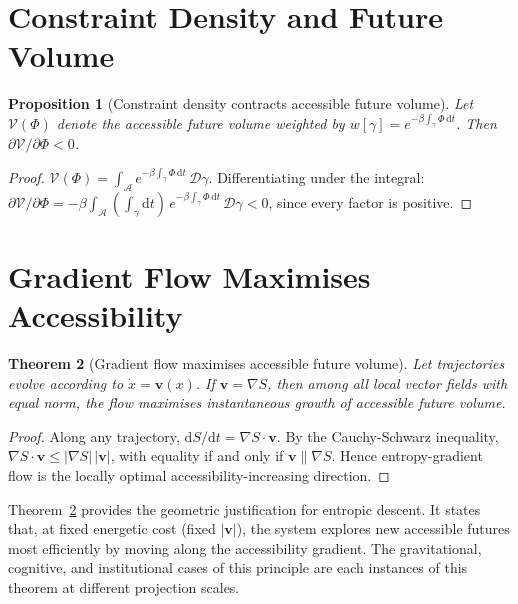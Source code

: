 \documentclass[12pt, oneside]{book}
\theoremstyle{plain}
\newtheorem{theorem}{Theorem}[chapter]
\newtheorem{proposition}[theorem]{Proposition}
\theoremstyle{definition}
\newcommand{\vfield}{\mathbf{v}}
\newcommand{\dd}{\mathrm{d}}
\newcommand{\nab}{\nabla}
\newcommand{\Vac}{\mathcal{V}}
\newcommand{\Adm}{\mathcal{A}}
\begin{document}
\section{Constraint Density and Future Volume}
\label{sec:constraint}

\begin{proposition}[Constraint density contracts accessible future volume]
\label{prop:contraction}
Let $\Vac(\Phi)$ denote the accessible future volume weighted by
$w[\gamma] = e^{-\beta\int_\gamma \Phi\, \dd t}$.
Then $\partial\Vac/\partial\Phi < 0$.
\end{proposition}

\begin{proof}
$\Vac(\Phi) = \int_{\Adm} e^{-\beta\int_\gamma \Phi\, \dd t}\, \mathcal{D}\gamma$.
Differentiating under the integral: $\partial\Vac/\partial\Phi
= -\beta\int_{\Adm}(\int_\gamma \dd t)\, e^{-\beta\int_\gamma\Phi\, \dd t}\,
\mathcal{D}\gamma < 0$, since every factor is positive.
\end{proof}

\section{Gradient Flow Maximises Accessibility}
\label{sec:gradient-flow}

\begin{theorem}[Gradient flow maximises accessible future volume]
\label{thm:gradient-flow}
Let trajectories evolve according to $\dot{x} = \vfield(x)$. If $\vfield = \nab S$,
then among all local vector fields with equal norm, the flow maximises instantaneous
growth of accessible future volume.
\end{theorem}

\begin{proof}
Along any trajectory, $\dd S/\dd t = \nab S \cdot \vfield$. By the Cauchy-Schwarz
inequality, $\nab S\cdot\vfield \leq |\nab S|\,|\vfield|$, with equality if and only
if $\vfield \parallel \nab S$. Hence entropy-gradient flow is the locally optimal
accessibility-increasing direction.
\end{proof}

Theorem~\ref{thm:gradient-flow} provides the geometric justification for entropic
descent. It states that, at fixed energetic cost (fixed $|\vfield|$), the system
explores new accessible futures most efficiently by moving along the accessibility
gradient. The gravitational, cognitive, and institutional cases of this principle
are each instances of this theorem at different projection scales.
\end{document}
